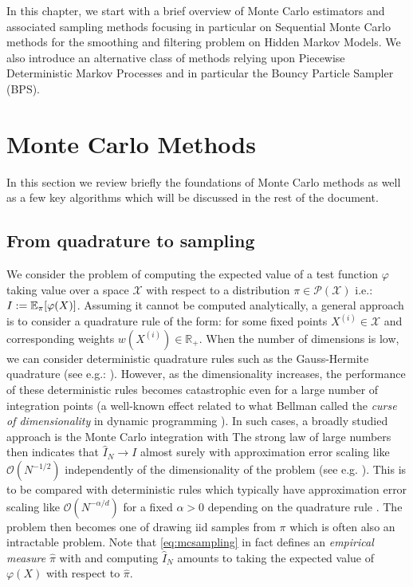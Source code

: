 
In this chapter, we start with a brief overview of Monte Carlo estimators and associated sampling methods focusing in particular on Sequential Monte Carlo methods for the smoothing and filtering problem on Hidden Markov Models. We also introduce an alternative class of methods relying upon Piecewise Deterministic Markov Processes and in particular the Bouncy Particle Sampler (BPS). 

\section{\label{sec:MC+SMC}Monte Carlo Methods}
In this section we review briefly the foundations of Monte Carlo methods as well as a few key algorithms which will be discussed in the rest of the document.

\subsection{From quadrature to sampling}
We consider the problem of computing the expected value of a test function $\varphi$ taking value over a space $\mathcal X$ with respect to a distribution $\pi\in\mathcal P(\mathcal X)$ i.e.: $I:=\mathbb E_\pi[\varphi(X)]$. Assuming it cannot be computed analytically, a general approach is to consider a quadrature rule of the form:
%
%
for some fixed points $X^{(i)}\in\mathcal X$ and corresponding weights $w(X^{(i)})\in\mathbb R_+$. 
When the number of dimensions is low, we can consider deterministic quadrature rules such as the Gauss-Hermite quadrature (see e.g.: \citet{davis75}). However, as the dimensionality increases, the performance of these deterministic rules becomes catastrophic even for a large number of integration points (a well-known effect related to what Bellman called the \emph{curse of dimensionality} in dynamic programming \citep{bellman57,bengtsson08}). 
In such cases, a broadly studied approach is the Monte Carlo integration with
%
%
The strong law of large numbers then indicates that $\widehat I_N\to I$ almost surely with approximation error scaling like $\mathcal O(N^{-1/2})$ independently of the dimensionality of the problem (see e.g. \cite{robert04}). This is to be compared with deterministic rules which typically have approximation error scaling like $\mathcal O(N^{-\alpha/d})$ for a fixed $\alpha>0$ depending on the quadrature rule \citep{caflisch98}. The problem then becomes one of drawing iid samples from $\pi$ which is often also an intractable problem. Note that \eqref{eq:mcsampling} in fact defines an \emph{empirical measure} $\hat \pi$ with
%
%
and computing $\hat I_{N}$ amounts to taking the expected value of $\varphi(X)$ with respect to $\hat\pi$.

